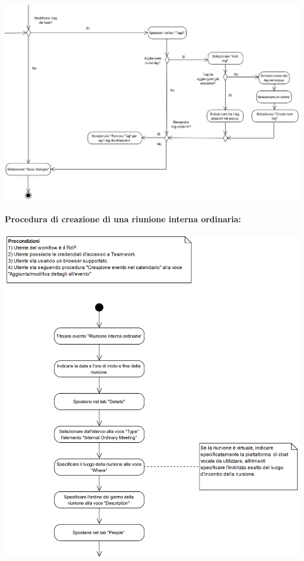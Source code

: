 \begin{center}
	\includegraphics[width=15cm]{./DiagrammiProcedure/EditTask5.png}
\end{center}

\paragraph{Procedura di creazione di una riunione interna ordinaria:}

\begin{center}
	\includegraphics[width=15cm]{./DiagrammiProcedure/RiunioneInternaOrdinaria1.png}
\end{center}

